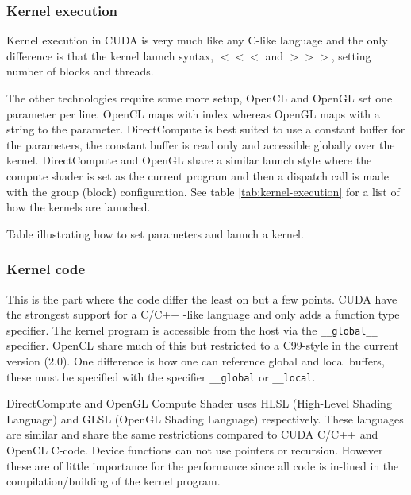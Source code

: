 \subsubsection{Kernel execution}

Kernel execution in CUDA is very much like any C-like language and the only difference is that the kernel launch syntax, $<<<$ and $>>>$, setting number of blocks and threads.

The other technologies require some more setup, OpenCL and OpenGL set one parameter per line. OpenCL maps with index whereas OpenGL maps with a string to the parameter. DirectCompute is best suited to use a constant buffer for the parameters, the constant buffer is read only and accessible globally over the kernel. DirectCompute and OpenGL share a similar launch style where the compute shader is set as the current program and then a dispatch call is made with the group (block) configuration. See table \ref{tab:kernel-execution} for a list of how the kernels are launched.

\begin{table}[H]
	\centering
	
	\caption{Table illustrating how to set parameters and launch a kernel.}
	\label{tab:kernel-execution}
\end{table}

\subsubsection{Kernel code}

This is the part where the code differ the least on but a few points. CUDA have the strongest support for a C/C++ -like language and only adds a function type specifier. The kernel program is accessible from the host via the \texttt{\_\_global\_\_} specifier. OpenCL share much of this but restricted to a C99-style in the current version (2.0). One difference is how one can reference global and local buffers, these must be specified with the specifier \texttt{\_\_global} or \texttt{\_\_local}.

DirectCompute and OpenGL Compute Shader uses HLSL (High-Level Shading Language) and GLSL (OpenGL Shading Language) respectively. These languages are similar and share the same restrictions compared to CUDA C/C++ and OpenCL C-code. Device functions can not use pointers or recursion. However these are of little importance for the performance since all code is in-lined in the compilation/building of the kernel program.

